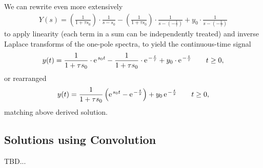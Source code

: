 \documentclass[11pt,a4paper,DIV=12]{scrartcl}
\begin{document}
We can rewrite even more extensively
\begin{align}
Y(s) = 	(\frac{1}{1 + \tau s_0}) \cdot \frac{1}{s-s_0} - (\frac{1}{1 + \tau s_0}) \cdot \frac{1}{s - (-\frac{1}{\tau})} +y_0 \cdot \frac{1}{s - (-\frac{1}{\tau})}
\end{align}
to apply linearity (each term in a sum can be independently treated) and inverse Laplace transforms of the one-pole spectra, to yield the continuous-time signal
\begin{align}
y(t) = \frac{1}{1 + \tau s_0} \cdot \e^{s_0 t} - \frac{1}{1 + \tau s_0} \cdot \e^{-\frac{t}{\tau}} + y_0 \cdot \e^{-\frac{t}{\tau}} \qquad t \geq 0,
\end{align}
or rearranged
\begin{align}
y(t) = \frac{1}{1 + \tau s_0} \left( \e^{s_0 t} - \e^{-\frac{t}{\tau}} \right) + y_0 \, \e^{-\frac{t}{\tau}} \qquad t \geq 0,
\end{align}
matching above derived solution.




\subsection{Solutions using Convolution}
TBD...












\newpage

\end{document}
